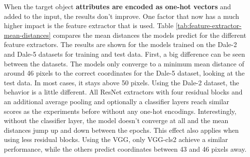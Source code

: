 When the target object \textbf{attributes are encoded as one-hot vectors} and added to the input, the results don't improve.
One factor that now has a much higher impact is the feature extractor that is used.
Table \ref{tab:feature-extractor-mean-distances} compares the mean distances the models predict for the different feature extractors.
The results are shown for the models trained on the Dale-2 and Dale-5 datasets for training and test data.
First, a big difference can be seen between the datasets.
The models only converge to a minimum mean distance of around 46 pixels to the correct coordinates for the Dale-5 dataset, looking at the test data.
In most cases, it stays above 50 pixels.
Using the Dale-2 dataset, the behavior is a little different.
All ResNet extractors with four residual blocks and an additional average pooling and optionally a classifier layers reach similar scores as the experiments before without any one-hot encodings.
Interestingly, without the classifier layer, the model doesn't converge at all and the mean distances jump up and down between the epochs.
This effect also applies when using less residual blocks.
Using the VGG, only VGG-cls2 achieve a similar performance, while the others predict coordinates between 43 and 46 pixels away.

